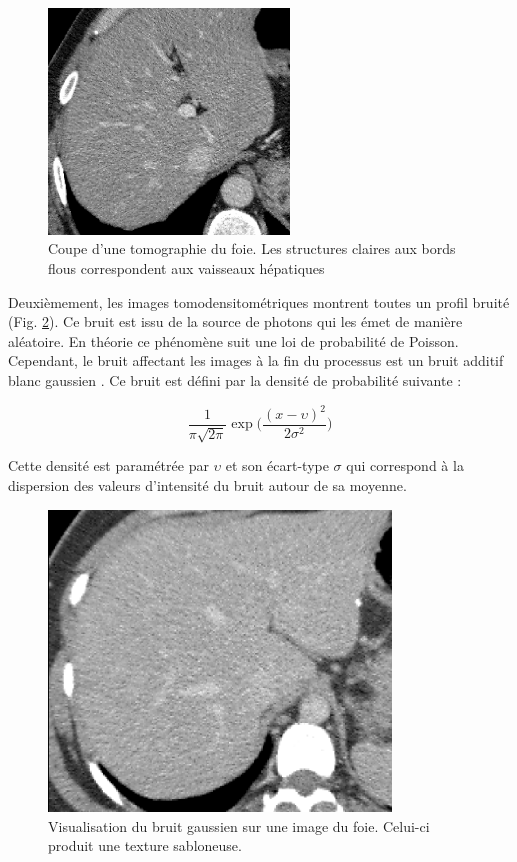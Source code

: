 \begin{figure}
    \centering
    \includegraphics[height=6cm]{Images/blury_vessels.png}
    \caption{Coupe d'une tomographie du foie. Les structures claires aux bords flous  correspondent aux vaisseaux hépatiques}
    \label{fig:CT_blur}
\end{figure}

Deuxièmement, les images tomodensitométriques montrent toutes un profil bruité (Fig. \ref{fig:CT_noise}). Ce bruit est issu de la source de photons qui les émet de manière aléatoire. En théorie ce phénomène suit une loi de probabilité de Poisson. Cependant, le bruit affectant les images à la fin du processus est un bruit additif blanc gaussien \cite{Lei1992_gaussianNoiseCT}. Ce bruit est défini par la densité de probabilité suivante :

\begin{equation}
\frac{1}{\pi \sqrt{2\pi} } \exp\big( \frac{ (x-\upsilon)^2}{2\sigma^2} )    
\end{equation}

Cette densité est paramétrée par  $\upsilon$ et son écart-type $\sigma$ qui correspond à la dispersion des valeurs d'intensité du bruit autour de sa moyenne.

\begin{figure}
    \centering
    \includegraphics[height=8cm]{Images/noise_CT.png}
    \caption{Visualisation du bruit gaussien sur une image du foie. Celui-ci produit une texture sabloneuse.}
    \label{fig:CT_noise}
\end{figure}

